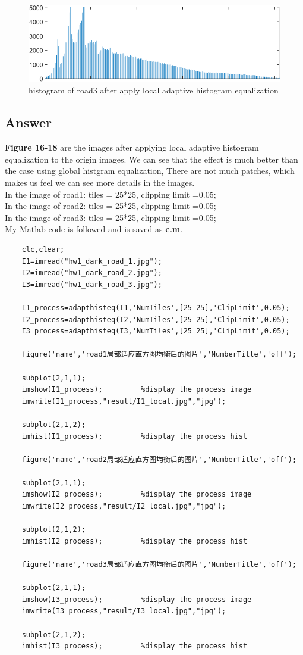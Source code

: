 \documentclass[
	12pt, %
]{fphw}
\begin{document}
\begin{figure}[H]
 
	\centering
	\includegraphics[width=1\columnwidth]{T2/result/hist3_local.png} 
	\caption{histogram of road3 after apply local adaptive histogram equalization}
	\label{fig21}
\end{figure}
\subsection*{Answer} 
\textbf{Figure 16-18} are the images after applying local adaptive histogram equalization to the origin images. We can see that the effect is much better than the case using global histgram equalization, There are not much patches, which makes us feel we can see more details in the images.\\
In the image of road1: tiles = 25*25, clipping limit =0.05;\\
In the image of road2: tiles = 25*25, clipping limit =0.05;\\
In the image of road3: tiles = 25*25, clipping limit =0.05;\\
My Matlab code is followed and is saved as \textbf{c.m}.
\begin{lstlisting}
	clc,clear;
	I1=imread("hw1_dark_road_1.jpg");
	I2=imread("hw1_dark_road_2.jpg");
	I3=imread("hw1_dark_road_3.jpg");

	I1_process=adapthisteq(I1,'NumTiles',[25 25],'ClipLimit',0.05);
	I2_process=adapthisteq(I2,'NumTiles',[25 25],'ClipLimit',0.05); 
	I3_process=adapthisteq(I3,'NumTiles',[25 25],'ClipLimit',0.05); 

	figure('name','road1局部适应直方图均衡后的图片','NumberTitle','off');

	subplot(2,1,1);
	imshow(I1_process);         %display the process image
	imwrite(I1_process,"result/I1_local.jpg","jpg");
			
	subplot(2,1,2);
	imhist(I1_process);         %display the process hist

	figure('name','road2局部适应直方图均衡后的图片','NumberTitle','off');

	subplot(2,1,1);
	imshow(I2_process);         %display the process image
	imwrite(I2_process,"result/I2_local.jpg","jpg");
			
	subplot(2,1,2);
	imhist(I2_process);         %display the process hist

	figure('name','road3局部适应直方图均衡后的图片','NumberTitle','off');

	subplot(2,1,1);
	imshow(I3_process);         %display the process image
	imwrite(I3_process,"result/I3_local.jpg","jpg");
			
	subplot(2,1,2);
	imhist(I3_process);         %display the process hist
\end{lstlisting}
\end{document}
